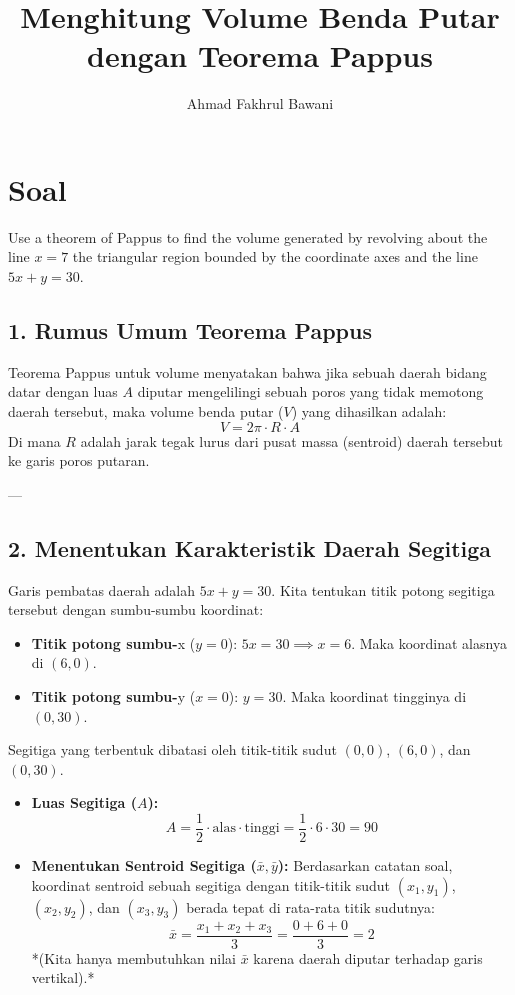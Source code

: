 \documentclass[12pt,a4paper]{article}
\title{Menghitung Volume Benda Putar dengan Teorema Pappus}
\author{Ahmad Fakhrul Bawani}
\date{}
\begin{document}
\maketitle

\section*{Soal}

Use a theorem of Pappus to find the volume generated by revolving about the line $x = 7$ the triangular region bounded by the coordinate axes and the line $5x + y = 30$.

\subsection*{1. Rumus Umum Teorema Pappus}
Teorema Pappus untuk volume menyatakan bahwa jika sebuah daerah bidang datar dengan luas $A$ diputar mengelilingi sebuah poros yang tidak memotong daerah tersebut, maka volume benda putar ($V$) yang dihasilkan adalah:
\begin{equation*}
  V = 2\pi \cdot R \cdot A
\end{equation*}
Di mana $R$ adalah jarak tegak lurus dari pusat massa (sentroid) daerah tersebut ke garis poros putaran.

---

\subsection*{2. Menentukan Karakteristik Daerah Segitiga}
Garis pembatas daerah adalah $5x + y = 30$. Kita tentukan titik potong segitiga tersebut dengan sumbu-sumbu koordinat:
\begin{itemize}
  \item \textbf{Titik potong sumbu-}x ($y = 0$): $5x = 30 \implies x = 6$. Maka koordinat alasnya di $(6,0)$.
  \item \textbf{Titik potong sumbu-}y ($x = 0$): $y = 30$. Maka koordinat tingginya di $(0,30)$.
\end{itemize}
Segitiga yang terbentuk dibatasi oleh titik-titik sudut $(0,0)$, $(6,0)$, dan $(0,30)$.

\begin{itemize}
  \item \textbf{Luas Segitiga ($A$):}
    \begin{equation*}
      A = \frac{1}{2} \cdot \text{alas} \cdot \text{tinggi} = \frac{1}{2} \cdot 6 \cdot 30 = 90
    \end{equation*}

  \item \textbf{Menentukan Sentroid Segitiga ($\bar{x}, \bar{y}$):}
    Berdasarkan catatan soal, koordinat sentroid sebuah segitiga dengan titik-titik sudut $(x_1, y_1)$, $(x_2, y_2)$, dan $(x_3, y_3)$ berada tepat di rata-rata titik sudutnya:
    \begin{equation*}
      \bar{x} = \frac{x_1 + x_2 + x_3}{3} = \frac{0 + 6 + 0}{3} = 2
    \end{equation*}
    *(Kita hanya membutuhkan nilai $\bar{x}$ karena daerah diputar terhadap garis vertikal).*
\end{itemize}
\end{document}
